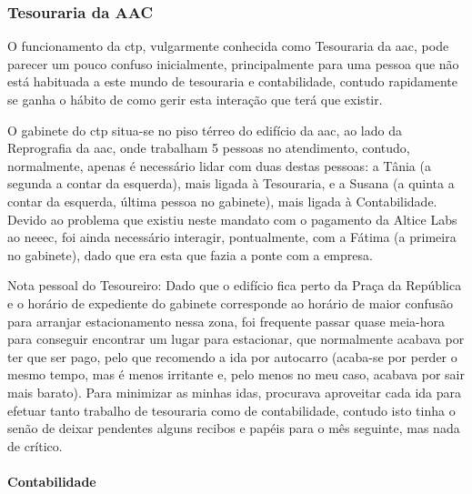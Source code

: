 
\subsubsection{Tesouraria da AAC} \label{subsubsec:tesourariaAAC}

O funcionamento da \acrfull{ctp}, vulgarmente conhecida como Tesouraria da \acrshort{aac}, pode parecer um pouco confuso inicialmente, principalmente para uma pessoa que não está habituada a este mundo de tesouraria e contabilidade, contudo rapidamente se ganha o hábito de como gerir esta interação que terá que existir.

O gabinete do \acrshort{ctp} situa-se no piso térreo do edifício da \acrshort{aac}, ao lado da Reprografia da \acrshort{aac}, onde trabalham 5 pessoas no atendimento, contudo, normalmente, apenas é necessário lidar com duas destas pessoas: a Tânia (a segunda a contar da esquerda), mais ligada à Tesouraria, e a Susana (a quinta a contar da esquerda, última pessoa no gabinete), mais ligada à Contabilidade. Devido ao problema que existiu neste mandato com o pagamento da Altice Labs ao \acrshort{neeec}, foi ainda necessário interagir, pontualmente, com a Fátima (a primeira no gabinete), dado que era esta que fazia a ponte com a empresa.

Nota pessoal do Tesoureiro: Dado que o edifício fica perto da Praça da República e o horário de expediente do gabinete corresponde ao horário de maior confusão para arranjar estacionamento nessa zona, foi frequente passar quase meia-hora para conseguir encontrar um lugar para estacionar, que normalmente acabava por ter que ser pago, pelo que recomendo a ida por autocarro (acaba-se por perder o mesmo tempo, mas é menos irritante e, pelo menos no meu caso, acabava por sair mais barato). Para minimizar as minhas idas, procurava aproveitar cada ida para efetuar tanto trabalho de tesouraria como de contabilidade, contudo isto tinha o senão de deixar pendentes alguns recibos e papéis para o mês seguinte, mas nada de crítico.

\paragraph{Contabilidade}

